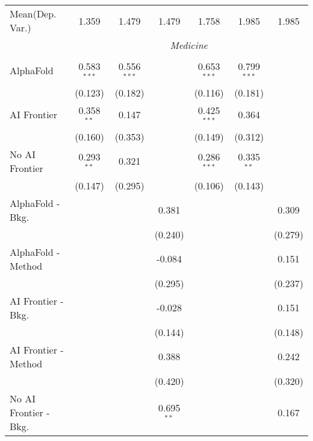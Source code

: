\begin{tabular}{lcccccc}
Mean(Dep. Var.) & 1.359 & 1.479 & 1.479 & 1.758 & 1.985 & 1.985 \\
 & \multicolumn{6}{c}{\textit{Medicine}} \\ \\
   AlphaFold               & 0.583$^{***}$ & 0.556$^{***}$ &              & 0.653$^{***}$ & 0.799$^{***}$ &   \\   
                           & (0.123)       & (0.182)       &              & (0.116)       & (0.181)       &   \\   
   AI Frontier             & 0.358$^{**}$  & 0.147         &              & 0.425$^{***}$ & 0.364         &   \\   
                           & (0.160)       & (0.353)       &              & (0.149)       & (0.312)       &   \\   
   No AI Frontier          & 0.293$^{**}$  & 0.321         &              & 0.286$^{***}$ & 0.335$^{**}$  &   \\   
                           & (0.147)       & (0.295)       &              & (0.106)       & (0.143)       &   \\   
   AlphaFold - Bkg.        &               &               & 0.381        &               &               & 0.309\\   
                           &               &               & (0.240)      &               &               & (0.279)\\   
   AlphaFold - Method      &               &               & -0.084       &               &               & 0.151\\   
                           &               &               & (0.295)      &               &               & (0.237)\\   
   AI Frontier - Bkg.      &               &               & -0.028       &               &               & 0.151\\   
                           &               &               & (0.144)      &               &               & (0.148)\\   
   AI Frontier - Method    &               &               & 0.388        &               &               & 0.242\\   
                           &               &               & (0.420)      &               &               & (0.320)\\   
   No AI Frontier - Bkg.   &               &               & 0.695$^{**}$ &               &               & 0.167\\   

\end{tabular}
